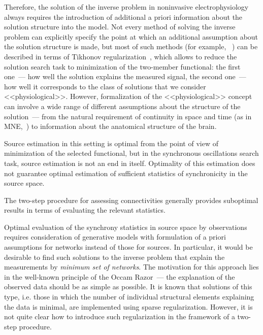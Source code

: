 Therefore, the solution of the inverse problem in noninvasive electrophysiology
always requires the introduction of additional a priori information about the
solution structure into the model. Not every method of solving the inverse
problem can explicitly specify the point at which an additional assumption
about the solution structure is made, but most of such methods (for example,
~\cite{Hamalainen1994, Uutela1999, Pascual-Marqui1994, Pascual-Marqui2002}) can
be described in terms of Tikhonov regularization~\cite{tikhonov}, which allows
to reduce the solution search task to minimization of the two-member
functional: the first one~--- how well the solution explains the measured
signal, the second one~--- how well it corresponds to the class of solutions
that we consider <<physiological>>. However, formalization of the
<<physiological>> concept can involve a wide range of different assumptions
about the structure of the solution~--- from the natural requirement of
continuity in space and time (as in MNE,~\cite{Hamalainen1994}) to information
about the anatomical structure of the brain.

Source estimation in this setting is optimal from the point of view of
minimization of the selected functional, but in the synchronous oscillations
search task, source estimation is not an end in itself. Optimality of this
estimation does not guarantee optimal estimation of sufficient statistics of
synchronicity in the source space.

The two-step procedure for assessing connectivities generally provides
suboptimal results in terms of evaluating the relevant statistics.

Optimal evaluation of the synchrony statistics in source space by observations
requires consideration of generative models with formulation of a priori
assumptions for networks instead of those for sources. In particular, it would
be desirable to find such solutions to the inverse problem that explain the
measurements by \emph{minimum set of networks}. The motivation for this
approach lies in the well-known principle of the Occam Razor~--- the
explanation of the observed data should be as simple as possible. It is known
that solutions of this type, i.e. those in which the number of individual
structural elements explaining the data is minimal, are implemented using
sparse regularization. However, it is not quite clear how to introduce such
regularization in the framework of a two-step procedure.



